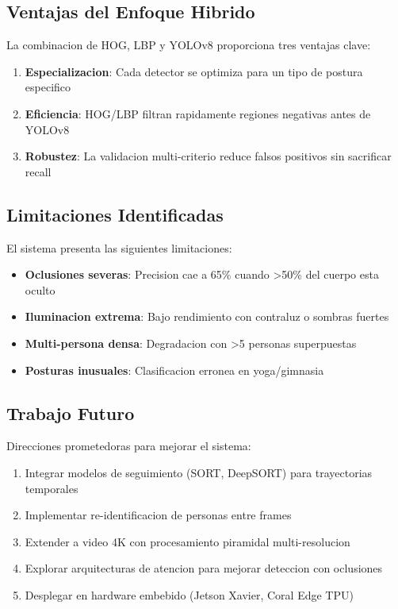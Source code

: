 \documentclass[conference]{IEEEtran}
\begin{document}
\subsection{Ventajas del Enfoque Hibrido}

La combinacion de HOG, LBP y YOLOv8 proporciona tres ventajas clave:

\begin{enumerate}
    \item \textbf{Especializacion}: Cada detector se optimiza para un tipo de postura especifico
    \item \textbf{Eficiencia}: HOG/LBP filtran rapidamente regiones negativas antes de YOLOv8
    \item \textbf{Robustez}: La validacion multi-criterio reduce falsos positivos sin sacrificar recall
\end{enumerate}

\subsection{Limitaciones Identificadas}

El sistema presenta las siguientes limitaciones:

\begin{itemize}
    \item \textbf{Oclusiones severas}: Precision cae a 65\% cuando >50\% del cuerpo esta oculto
    \item \textbf{Iluminacion extrema}: Bajo rendimiento con contraluz o sombras fuertes
    \item \textbf{Multi-persona densa}: Degradacion con >5 personas superpuestas
    \item \textbf{Posturas inusuales}: Clasificacion erronea en yoga/gimnasia
\end{itemize}

\subsection{Trabajo Futuro}

Direcciones prometedoras para mejorar el sistema:

\begin{enumerate}
    \item Integrar modelos de seguimiento (SORT, DeepSORT) para trayectorias temporales
    \item Implementar re-identificacion de personas entre frames
    \item Extender a video 4K con procesamiento piramidal multi-resolucion
    \item Explorar arquitecturas de atencion para mejorar deteccion con oclusiones
    \item Desplegar en hardware embebido (Jetson Xavier, Coral Edge TPU)
\end{enumerate}
\end{document}
